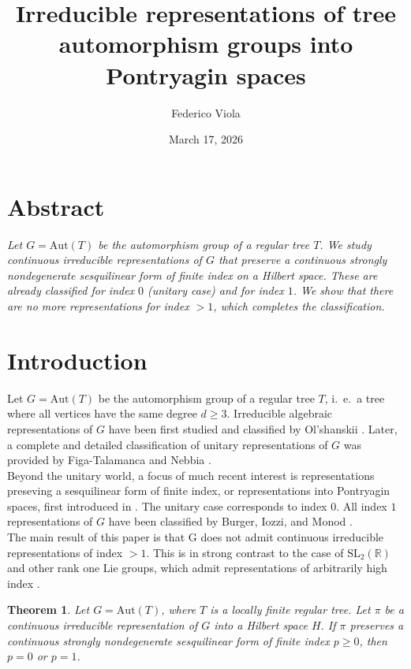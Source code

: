 \documentclass{article}
\title{Irreducible representations of tree automorphism groups into Pontryagin spaces}
\author{Federico Viola}
\date{March 17, 2026}
\theoremstyle{definition}
\theoremstyle{remark}
\theoremstyle{plain}
\newtheorem{thm}[dfn]{Theorem}
\begin{document}
\maketitle

\section*{Abstract}

\textit{Let $G=\mathrm{Aut}(T)$ be the automorphism group of a regular tree $T$. We study continuous irreducible representations of $G$ that preserve a continuous strongly nondegenerate sesquilinear form of finite index on a Hilbert space. These are already classified for index $0$ (unitary case) and for index $1$. We show that there are no more representations for index $>1$, which completes the classification.} \\

\section{Introduction}

Let $G=\mathrm{Aut}(T)$ be the automorphism group of a regular tree $T$, i.~e.~a tree where all vertices have the same degree $d\geq 3$. Irreducible algebraic representations of $G$ have been first studied and classified by Ol'shanskii \cite{olsh}. Later, a complete and detailed classification of unitary representations of $G$ was provided by Figa-Talamanca and Nebbia \cite{talanebbia}. \\

Beyond the unitary world, a focus of much recent interest is representations preseving a sesquilinear form of finite index, or representations into Pontryagin spaces, first introduced in \cite{pontryagin}. The unitary case corresponds to index $0$. All index $1$ representations of $G$ have been classified by Burger, Iozzi, and Monod \cite{bim}. \\

The main result of this paper is that G does not admit continuous irreducible representations of index $>1$. This is in strong contrast to the case of $\mathrm{SL}_2(\mathbb{R})$ and other rank one Lie groups, which admit representations of arbitrarily high index \cite{delzantpy,monodpy}. \\

\begin{thm} \label{first}
    Let $G=\mathrm{Aut}(T)$, where $T$ is a locally finite regular tree. Let $\pi$ be a continuous irreducible representation of $G$ into a Hilbert space $H$. If $\pi$ preserves a continuous strongly nondegenerate sesquilinear form of finite index $p\geq 0$, then $p=0$ or $p=1$.
\end{thm}
\end{document}
